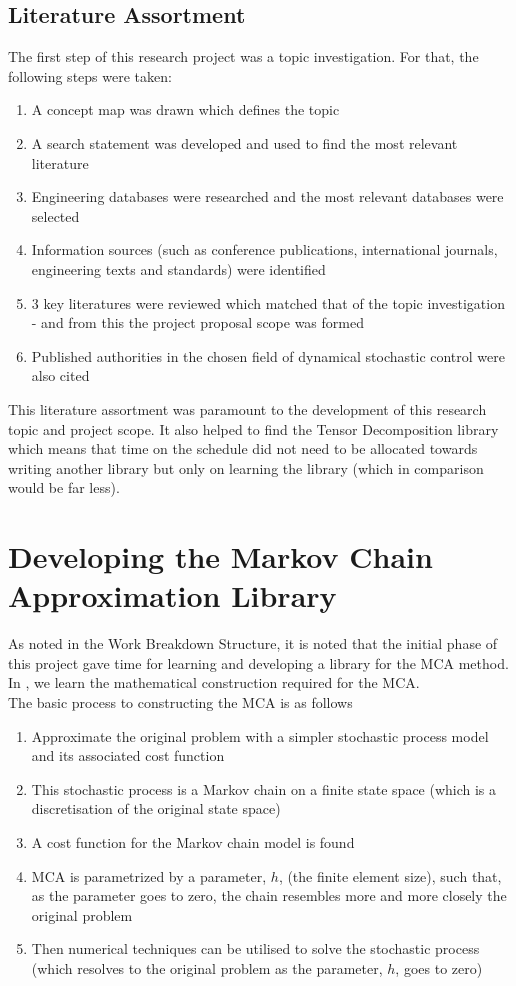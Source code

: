 \documentclass[11pt,draftd]{article}
\begin{document}
\subsection{Literature Assortment}
The first step of this research project was a topic investigation. For that, the following steps were taken:
\begin{enumerate}
	\item A concept map was drawn which defines the topic
	\item A search statement was developed and used to find the most relevant literature
	\item Engineering databases were researched and the most relevant databases were selected
	\item Information sources (such as conference publications, international journals, engineering texts and standards) were identified
	\item 3 key literatures were reviewed which matched that of the topic investigation - and from this the project proposal scope was formed
	\item Published authorities in the chosen field of dynamical stochastic control were also cited	
\end{enumerate}
This literature assortment was paramount to the development of this research topic and project scope. It also helped to find the Tensor Decomposition library which means that time on the schedule did not need to be allocated towards writing another library but only on learning the library (which in comparison would be far less). \\

\section{Developing the Markov Chain Approximation Library}
As noted in the Work Breakdown Structure, it is noted that the initial phase of this project gave time for learning and developing a library for the MCA method. In \cite{kushner}, we learn the mathematical construction required for the MCA.  \\

The basic process to constructing the MCA is as follows
\begin{enumerate}
	\item Approximate the original problem with a simpler stochastic process model and its associated cost function
	\item This stochastic process is a Markov chain on a finite state space (which is a discretisation of the original state space)
	\item A cost function for the Markov chain model is found
	\item MCA is parametrized by a parameter, $ h $, (the finite element size), such that, as the parameter goes to zero, the chain resembles more and more closely the original problem
	\item Then numerical techniques can be utilised to solve the stochastic process (which resolves to the original problem as the parameter, $ h $, goes to zero)
\end{enumerate}
\[\]
\end{document}

